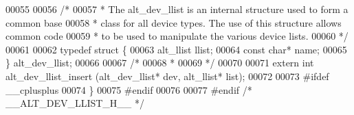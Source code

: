 \begin{DoxyCode}
00055 
00056 \textcolor{comment}{/*}
00057 \textcolor{comment}{ * The alt\_dev\_llist is an internal structure used to form a common base }
00058 \textcolor{comment}{ * class for all device types. The use of this structure allows common code}
00059 \textcolor{comment}{ * to be used to manipulate the various device lists.}
00060 \textcolor{comment}{ */}
00061 
00062 \textcolor{keyword}{typedef} \textcolor{keyword}{struct }\{
00063   alt_llist llist;
00064   \textcolor{keyword}{const} \textcolor{keywordtype}{char}* name;
00065 \} alt_dev_llist;
00066 
00067 \textcolor{comment}{/*}
00068 \textcolor{comment}{ *}
00069 \textcolor{comment}{ */}
00070 
00071 \textcolor{keyword}{extern} \textcolor{keywordtype}{int} alt_dev_llist_insert (alt_dev_llist* dev, alt_llist* list);
00072 
00073 \textcolor{preprocessor}{#ifdef \_\_cplusplus}
00074 \}
00075 \textcolor{preprocessor}{#endif}
00076 
00077 \textcolor{preprocessor}{#endif }\textcolor{comment}{/* \_\_ALT\_DEV\_LLIST\_H\_\_ */}\textcolor{preprocessor}{}
\end{DoxyCode}
